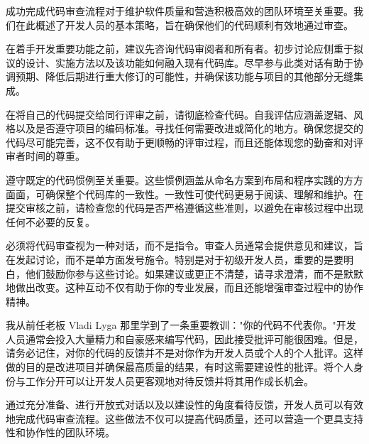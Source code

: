 
成功完成代码审查流程对于维护软件质量和营造积极高效的团队环境至关重要。我们在此概述了开发人员的基本策略，旨在确保他们的代码顺利有效地通过审查。


在着手开发重要功能之前，建议先咨询代码审阅者和所有者。初步讨论应侧重于拟议的设计、实施方法以及该功能如何融入现有代码库。尽早参与此类对话有助于协调预期、降低后期进行重大修订的可能性，并确保该功能与项目的其他部分无缝集成。


在将自己的代码提交给同行评审之前，请彻底检查代码。自我评估应涵盖逻辑、风格以及是否遵守项目的编码标准。寻找任何需要改进或简化的地方。确保您提交的代码尽可能完善，这不仅有助于更顺畅的评审过程，而且还能体现您的勤奋和对评审者时间的尊重。


遵守既定的代码惯例至关重要。这些惯例涵盖从命名方案到布局和程序实践的方方面面，可确保整个代码库的一致性。一致性可使代码更易于阅读、理解和维护。在提交审核之前，请检查您的代码是否严格遵循这些准则，以避免在审核过程中出现任何不必要的反复。


必须将代码审查视为一种对话，而不是指令。审查人员通常会提供意见和建议，旨在发起讨论，而不是单方面发号施令。特别是对于初级开发人员，重要的是要明白，他们鼓励你参与这些讨论。如果建议或更正不清楚，请寻求澄清，而不是默默地做出改变。这种互动不仅有助于你的专业发展，而且还能增强审查过程中的协作精神。


我从前任老板 Vladi Lyga 那里学到了一条重要教训："你的代码不代表你。"开发人员通常会投入大量精力和自豪感来编写代码，因此接受批评可能很困难。但是，请务必记住，对你的代码的反馈并不是对你作为开发人员或个人的个人批评。这样做的目的是改进项目并确保最高质量的结果，有时这需要建设性的批评。将个人身份与工作分开可以让开发人员更客观地对待反馈并将其用作成长机会。

通过充分准备、进行开放式对话以及以建设性的角度看待反馈，开发人员可以有效地完成代码审查流程。这些做法不仅可以提高代码质量，还可以营造一个更具支持性和协作性的团队环境。
